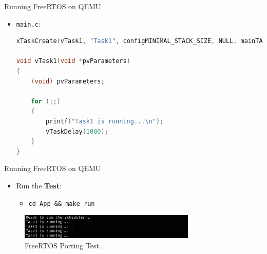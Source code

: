 \begin{frame}[fragile]{Running FreeRTOS on QEMU}
    \begin{itemize}
        \item \texttt{main.c}:
            \begin{lstlisting}[language=C]
xTaskCreate(vTask1, "Task1", configMINIMAL_STACK_SIZE, NULL, mainTASK_PRIORITY, NULL);

void vTask1(void *pvParameters) 
{
    (void) pvParameters;

    for (;;) 
    {
        printf("Task1 is running...\n");
        vTaskDelay(1000);
    }
}
            \end{lstlisting}
    \end{itemize}
\end{frame}

\begin{frame}[fragile]{Running FreeRTOS on QEMU}
    \begin{itemize}
        \item Run the \textbf{Test}:
            \begin{itemize}
                \item \texttt{cd App \&\& make run}
            \end{itemize}
    \end{itemize}
    \begin{figure}[h]
        \centering
        \includegraphics[width=0.75\textwidth]{images/freertos_porting.png}
        \caption{FreeRTOS Porting Test.}
    \end{figure}
\end{frame}

